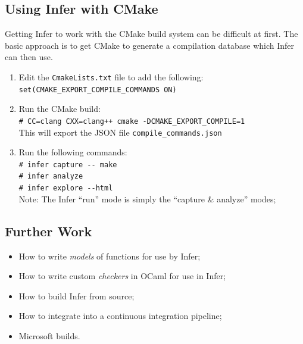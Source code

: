 \subsection{Using Infer with CMake}

Getting Infer to work with the CMake build system can be difficult at first.
The basic approach is to get CMake to generate a compilation database
which Infer can then use.

\begin{enumerate}
	\item Edit the \verb|CmakeLists.txt| file to add the following:\\
	\verb|set(CMAKE_EXPORT_COMPILE_COMMANDS ON)|
	\item Run the CMake build:\\
	\verb|# CC=clang CXX=clang++ cmake -DCMAKE_EXPORT_COMPILE=1|\\
	This will export the JSON file  \verb|compile_commands.json|
	\item Run the following commands:\\
	\verb|# infer capture -- make|\\
	\verb|# infer analyze|\\
	\verb|# infer explore --html|\\
	Note: The Infer ``run'' mode is simply the ``capture \& analyze'' modes;
	
\end{enumerate}

\subsection{Further Work}
\begin{itemize}
	\item How to write \textit{models} of functions for use by Infer;
	\item How to write custom \textit{checkers} in OCaml for use in Infer;
	\item How to build Infer from source;
	\item How to integrate into a continuous integration pipeline;
	\item Microsoft builds.
\end{itemize}
